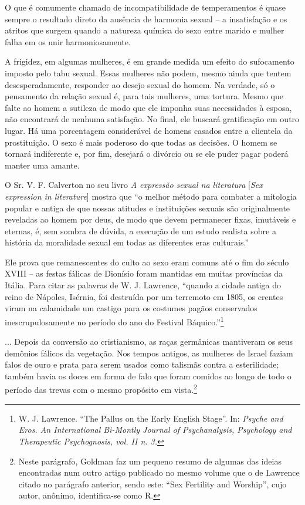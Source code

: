 \asterisc

O que é comumente chamado de incompatibilidade de temperamentos é quase
sempre o resultado direto da ausência de harmonia sexual -- a
insatisfação e os atritos que surgem quando a natureza química do sexo
entre marido e mulher falha em os unir harmoniosamente.

A frigidez, em algumas mulheres, é em grande medida um efeito do
sufocamento imposto pelo tabu sexual. Essas mulheres não podem, mesmo
ainda que tentem desesperadamente, responder ao desejo sexual do homem.
Na verdade, só o pensamento da relação sexual é, para tais mulheres, uma
tortura. Mesmo que falte ao homem a sutileza de modo que ele imponha
suas necessidades à esposa, não encontrará de nenhuma satisfação. No
final, ele buscará gratificação em outro lugar. Há uma porcentagem
considerável de homens casados entre a clientela da prostituição. O sexo
é mais poderoso do que todas as decisões. O homem se tornará indiferente
e, por fim, desejará o divórcio ou se ele puder pagar poderá manter uma
amante.

\asterisc

O Sr. V. F. Calverton no seu livro \emph{A expressão sexual na
literatura} {[}\emph{Sex expression in literature}{]} mostra que ``o
melhor método para combater a mitologia popular e antiga de que nossas
atitudes e instituições sexuais são originalmente reveladas ao homem por
deus, de modo que devem permanecer fixas, imutáveis e eternas, é, sem
sombra de dúvida, a execução de um estudo realista sobre a história da
moralidade sexual em todas as diferentes eras culturais.''

Ele prova que remanescentes do culto ao sexo eram comuns até o fim do
século XVIII -- as festas fálicas de Dionísio foram mantidas em muitas
províncias da Itália. Para citar as palavras de W. J. Lawrence, ``quando
a cidade antiga do reino de Nápoles, Isérnia, foi destruída por um
terremoto em 1805, os crentes viram na calamidade um castigo para os
costumes pagãos conservados inescrupulosamente no período do ano do
Festival Báquico.''\footnote{W. J. Lawrence. ``The Pallus on the Early
  English Stage''. In: \emph{Psyche and Eros. An International Bi-Montly
  Journal of Psychanalysis, Psychology and Therapeutic Psychognosis,
  vol. II n. 3.}}

... Depois da conversão ao cristianismo, as raças germânicas mantiveram
os seus demônios fálicos da vegetação. Nos tempos antigos, as mulheres
de Israel faziam falos de ouro e prata para serem usados como talismãs
contra a esterilidade; também havia os doces em forma de falo que foram
comidos ao longo de todo o período das trevas com o mesmo propósito em
vista.\footnote{Neste parágrafo, Goldman faz um pequeno resumo de
  algumas das ideias encontradas num outro artigo publicado no mesmo
  volume que o de Lawrence citado no parágrafo anterior, sendo este:
  ``Sex Fertility and Worship'', cujo autor, anônimo, identifica-se como
  R.}

